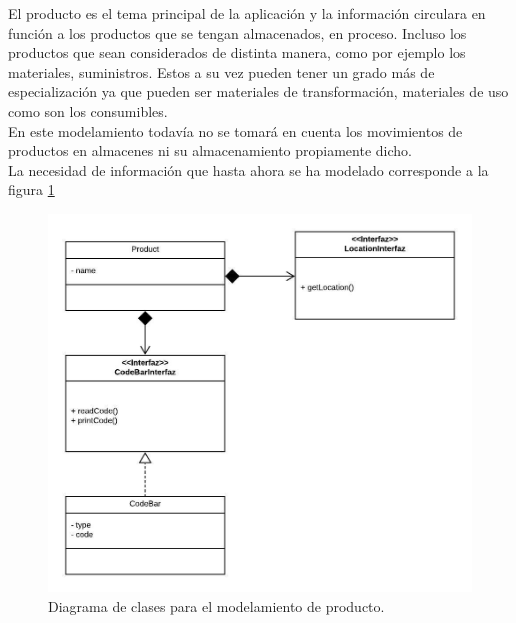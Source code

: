 El producto es el tema principal de la aplicación y la información circulara en función a los productos que se tengan almacenados, en proceso. Incluso los productos que sean considerados de distinta manera, como por ejemplo los materiales, suministros. Estos a su vez pueden tener un grado más de especialización ya que pueden ser materiales de transformación, materiales de uso como son los consumibles.\\

En este modelamiento todavía no se tomará en cuenta los movimientos de productos en almacenes ni su almacenamiento propiamente dicho.\\

La necesidad de información que hasta ahora se ha modelado corresponde a la figura \ref{Product-classes}

\begin{figure}
  \centering
    \includegraphics[scale=0.9]{./Capitulo3/figs/ADDStock-Product.jpeg}
  \caption{Diagrama de clases para el modelamiento de producto.}
  \label{Product-classes}
\end{figure}